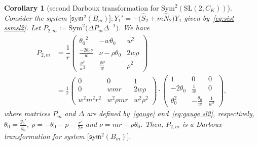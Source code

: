 \documentclass[pdftex]{sigma}%
\numberwithin{equation}{section}
\newtheorem{Corollary}[Theorem]{Corollary}
\def\Sym{\mathrm{Sym}}
\def\sym{\mathfrak{s}\mathrm{y}\mathfrak{m}}
\begin{document}
\begin{Corollary}[second Darboux transformation for $\Sym^2 (\mathrm{SL}(2,C_K))$] \label{thnudarsl22} Consider the system $\big[\sym^2 (B_m)\big]\colon Y_1'=-\big(\widehat{S}_2 + m \widehat{N}_2\big) Y_1$ given by~\eqref{eq:sist ssmsl2}.
Let $P_{2,m} :=\Sym^2 \big(\Delta P_m \Delta^{-1}\big)$. We have
\begin{align}
 P_{2,m} &= \dfrac{1}{r} \begin{pmatrix} {\theta_0}^{2}&-w \theta_0&{w}^{2}
\\ \frac{-2 \theta_0 \nu }{w}&\nu- \rho \theta_0&2 w \rho
\\ \frac {\nu^{2}}{{w}^{2}}&{\frac {\rho \nu }{w}}&{\rho}^{2}\end{pmatrix}\nonumber
\\
&= \frac1{r}\begin{pmatrix}
0&0&1\\ 0&wmr&2 w\rho
\\ {w}^{2}{m}^{2}{r}^{2}&{w}^{2}\rho mr&{w}^{2}{
\rho}^{2}
\end{pmatrix}
\cdot
\begin{pmatrix}
1&0&0\\ -2 \theta_{{0}}
&\frac1{w}&0\\ \theta_{{0}}^{2}&-{\frac{\theta_{0}}{w}}& 	\frac1{w^2}
\end{pmatrix}\!,\label{eq:DT sl22}
\end{align}
where matrices $P_m$ and $\Delta$ are defined by~\eqref{gauge} and~\eqref{eq:gauge sl2}, respectively, $\theta_0= \frac{y_0'}{y_0}$, $\rho = -\theta_0- p - \frac{r'}{2r}$
and $\nu=mr - \rho \theta_0$.
Then, $P_{2,m}$ is a Darboux transformation for system $\big[\sym^2 (B_m)\big]$.
\end{Corollary}
\end{document}
